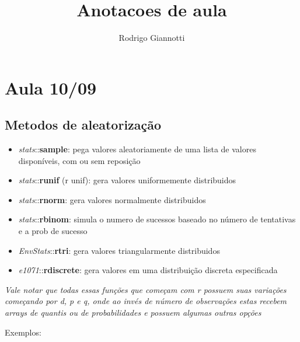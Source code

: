 \documentclass[
]{article}
\title{Anotacoes de aula}
\author{Rodrigo Giannotti}
\date{}
\newenvironment{Shaded}{\begin{snugshade}}{\end{snugshade}}
\newcommand{\CommentTok}[1]{\textcolor[rgb]{0.56,0.35,0.01}{\textit{#1}}}
\newcommand{\DataTypeTok}[1]{\textcolor[rgb]{0.13,0.29,0.53}{#1}}
\newcommand{\DecValTok}[1]{\textcolor[rgb]{0.00,0.00,0.81}{#1}}
\newcommand{\KeywordTok}[1]{\textcolor[rgb]{0.13,0.29,0.53}{\textbf{#1}}}
\newcommand{\NormalTok}[1]{#1}
\newcommand{\OperatorTok}[1]{\textcolor[rgb]{0.81,0.36,0.00}{\textbf{#1}}}
\newcommand{\StringTok}[1]{\textcolor[rgb]{0.31,0.60,0.02}{#1}}
\providecommand{\tightlist}{%
  \setlength{\itemsep}{0pt}\setlength{\parskip}{0pt}}
\begin{document}
\maketitle

\hypertarget{aula-1009}{%
\section{Aula 10/09}\label{aula-1009}}

\hypertarget{metodos-de-aleatorizauxe7uxe3o}{%
\subsection{Metodos de
aleatorização}\label{metodos-de-aleatorizauxe7uxe3o}}

\begin{itemize}
\tightlist
\item
  \emph{stats}::\textbf{sample}: pega valores aleatoriamente de uma
  lista de valores disponíveis, com ou sem reposição
\item
  \emph{stats}::\textbf{runif} (r unif): gera valores uniformemente
  distribuidos
\item
  \emph{stats}::\textbf{rnorm}: gera valores normalmente distribuidos
\item
  \emph{stats}::\textbf{rbinom}: simula o numero de sucessos baseado no
  número de tentativas e a prob de sucesso
\item
  \emph{EnvStats}::\textbf{rtri}: gera valores triangularmente
  distribuidos
\item
  \emph{e1071}::\textbf{rdiscrete}: gera valores em uma distribuição
  discreta especificada
\end{itemize}

\emph{Vale notar que todas essas funções que começam com r possuem suas
variações começando por d, p e q, onde ao invés de número de observações
estas recebem arrays de quantis ou de probabilidades e possuem algumas
outras opções}

Exemplos:

\begin{Shaded}
\end{Shaded}
\end{document}
